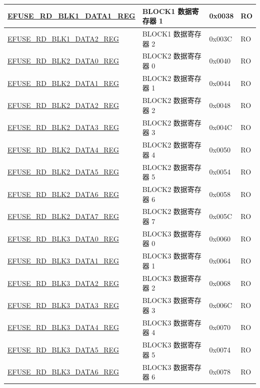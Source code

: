 \begin{longtable}{ | p{6cm} | p{7.2cm} | p{1.3cm} | p{1.5cm} | }
\hyperref[regdesc:EFUSERDBLK1DATA1REG]{EFUSE\_RD\_BLK1\_DATA1\_REG} & BLOCK1 数据寄存器 1 & 0x0038 & RO \\ \hline
\hyperref[regdesc:EFUSERDBLK1DATA2REG]{EFUSE\_RD\_BLK1\_DATA2\_REG} & BLOCK1 数据寄存器 2 & 0x003C & RO \\ \hline
\hyperref[regdesc:EFUSERDBLK2DATA0REG]{EFUSE\_RD\_BLK2\_DATA0\_REG} & BLOCK2 数据寄存器 0 & 0x0040 & RO \\ \hline
\hyperref[regdesc:EFUSERDBLK2DATA1REG]{EFUSE\_RD\_BLK2\_DATA1\_REG} & BLOCK2 数据寄存器 1 & 0x0044 & RO \\ \hline
\hyperref[regdesc:EFUSERDBLK2DATA2REG]{EFUSE\_RD\_BLK2\_DATA2\_REG} & BLOCK2 数据寄存器 2 & 0x0048 & RO \\ \hline
\hyperref[regdesc:EFUSERDBLK2DATA3REG]{EFUSE\_RD\_BLK2\_DATA3\_REG} & BLOCK2 数据寄存器 3 & 0x004C & RO \\ \hline
\hyperref[regdesc:EFUSERDBLK2DATA4REG]{EFUSE\_RD\_BLK2\_DATA4\_REG} & BLOCK2 数据寄存器 4 & 0x0050 & RO \\ \hline
\hyperref[regdesc:EFUSERDBLK2DATA5REG]{EFUSE\_RD\_BLK2\_DATA5\_REG} & BLOCK2 数据寄存器 5 & 0x0054 & RO \\ \hline
\hyperref[regdesc:EFUSERDBLK2DATA6REG]{EFUSE\_RD\_BLK2\_DATA6\_REG} & BLOCK2 数据寄存器 6 & 0x0058 & RO \\ \hline
\hyperref[regdesc:EFUSERDBLK2DATA7REG]{EFUSE\_RD\_BLK2\_DATA7\_REG} & BLOCK2 数据寄存器 7 & 0x005C & RO \\ \hline
\hyperref[regdesc:EFUSERDBLK3DATA0REG]{EFUSE\_RD\_BLK3\_DATA0\_REG} & BLOCK3 数据寄存器 0 & 0x0060 & RO \\ \hline
\hyperref[regdesc:EFUSERDBLK3DATA1REG]{EFUSE\_RD\_BLK3\_DATA1\_REG} & BLOCK3 数据寄存器 1 & 0x0064 & RO \\ \hline
\hyperref[regdesc:EFUSERDBLK3DATA2REG]{EFUSE\_RD\_BLK3\_DATA2\_REG} & BLOCK3 数据寄存器 2 & 0x0068 & RO \\ \hline
\hyperref[regdesc:EFUSERDBLK3DATA3REG]{EFUSE\_RD\_BLK3\_DATA3\_REG} & BLOCK3 数据寄存器 3 & 0x006C & RO \\ \hline
\hyperref[regdesc:EFUSERDBLK3DATA4REG]{EFUSE\_RD\_BLK3\_DATA4\_REG} & BLOCK3 数据寄存器 4 & 0x0070 & RO \\ \hline
\hyperref[regdesc:EFUSERDBLK3DATA5REG]{EFUSE\_RD\_BLK3\_DATA5\_REG} & BLOCK3 数据寄存器 5 & 0x0074 & RO \\ \hline
\hyperref[regdesc:EFUSERDBLK3DATA6REG]{EFUSE\_RD\_BLK3\_DATA6\_REG} & BLOCK3 数据寄存器 6 & 0x0078 & RO \\ \hline

\end{longtable}
